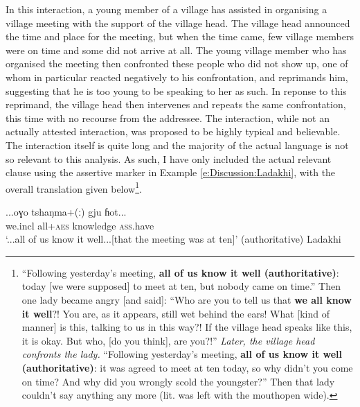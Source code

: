 In this interaction, a young member of a village has assisted in organising a village meeting with the support of the village head. The village head announced the time and place for the meeting, but when the time came, few village members were on time and some did not arrive at all. The young village member who has organised the meeting then confronted these people who did not show up, one of whom in particular reacted negatively to his confrontation, and reprimands him, suggesting that he is too young to be speaking to her as such. In reponse to this reprimand, the village head then intervenes and repeats the same confrontation, this time with no recourse from the addressee. The interaction, while not an actually attested interaction, was proposed to be highly typical and believable. The interaction itself is quite long and the majority of the actual language is not so relevant to this analysis. As such, I have only included the actual relevant clause using the assertive marker in Example \ref{e:Discussion:Ladakhi}, with the overall translation given below\footnote{``Following yesterday's meeting, \textbf{all of us know it well (authoritative)}: today [we were supposed] to meet at ten, but nobody came on time.'' Then one lady became angry [and said]: ``Who are you to tell us that \textbf{we all know it well}?! You are, as it appears, still wet behind the ears! What [kind of manner] is this, talking to us in this way?! If the village head speaks like this, it is okay. But who, [do you think], are you?!'' \textit{Later, the village head confronts the lady.} ``Following yesterday's meeting, \textbf{all of us know it well (authoritative)}: it was agreed to meet at ten today, so why didn't you come on time? And why did you wrongly scold the youngster?'' Then that lady couldn't say anything any more (lit. was left with the mouthopen wide).\cite[77]{ZeislerForthcoming}}.

\begin{exe}
    \ex\label{e:Discussion:Ladakhi}
    \gll ...oɣo tshaŋma+(ː) gju ɦot... \\
    we.incl all+\textsc{aes} knowledge \textsc{ass}.have \\
    \glt `...all of us know it well...[that the meeting was at ten]' (authoritative)
    Ladakhi \cite[Tibetic:India,][77]{ZeislerForthcoming}
\end{exe}

